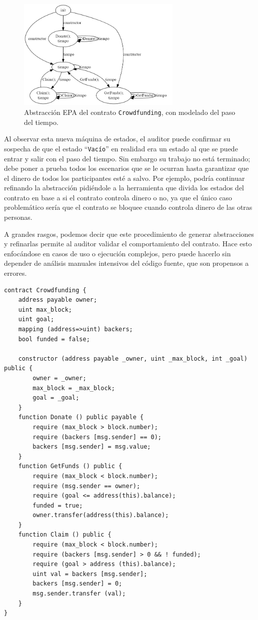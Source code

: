 \begin{figure}[h]
    \centering
    \includegraphics[width=0.70\textwidth]{figs/crowdfunding-time-epa.png}
    \caption{Abstracción EPA del contrato \texttt{Crowdfunding}, con modelado del paso del tiempo.}
    \label{fig:crowdfunding-time-epa}
\end{figure}

Al observar esta nueva máquina de estados, el auditor puede confirmar su sospecha de que el estado ``\texttt{Vacío}'' en realidad era un estado al que se puede entrar y salir con el paso del tiempo.
Sin embargo su trabajo no está terminado; debe poner a prueba todos los escenarios que se le ocurran hasta garantizar que el dinero de todos los participantes esté a salvo.
Por ejemplo, podría continuar refinando la abstracción pidiéndole a la herramienta que divida los estados del contrato en base a si el contrato controla dinero o no, ya que el único caso problemático sería que el contrato se bloquee cuando controla dinero de las otras personas.

A grandes rasgos, podemos decir que este procedimiento de generar abstracciones y refinarlas permite al auditor validar el comportamiento del contrato.
Hace esto enfocándose en casos de uso o ejecución complejos, pero puede hacerlo sin depender de análisis manuales intensivos del código fuente, que son propensos a errores.

\begin{lstlisting}[language=Solidity, label={code:crowdfunding-solidity}, caption=Implementación de la recaudación]
contract Crowdfunding {
    address payable owner;
    uint max_block;
    uint goal;
    mapping (address=>uint) backers;
    bool funded = false;
    
    constructor (address payable _owner, uint _max_block, int _goal) public {
        owner = _owner;
        max_block = _max_block;
        goal = _goal;
    }
    function Donate () public payable {
        require (max_block > block.number);
        require (backers [msg.sender] == 0);
        backers [msg.sender] = msg.value;
    }
    function GetFunds () public {
        require (max_block < block.number);
        require (msg.sender == owner);
        require (goal <= address(this).balance);
        funded = true;
        owner.transfer(address(this).balance);
    }
    function Claim () public {
        require (max_block < block.number);
        require (backers [msg.sender] > 0 && ! funded);
        require (goal > address (this).balance);
        uint val = backers [msg.sender];
        backers [msg.sender] = 0;
        msg.sender.transfer (val);
    }
}
    
\end{lstlisting}